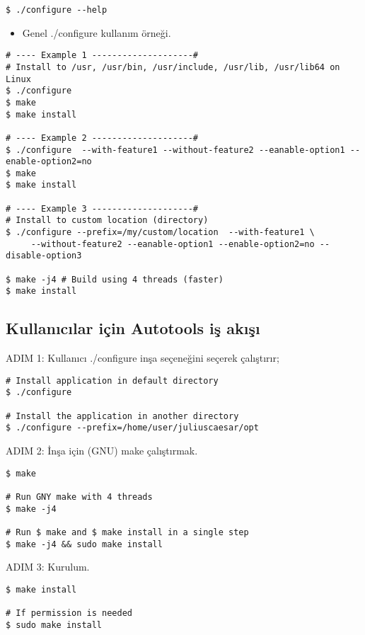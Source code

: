 \documentclass[
]{book}
\providecommand{\tightlist}{%
  \setlength{\itemsep}{0pt}\setlength{\parskip}{0pt}}
\begin{document}
\texttt{\$\ ./configure\ -\/-help}

\begin{itemize}
\tightlist
\item
  Genel ./configure kullanım örneği.
\end{itemize}

\begin{verbatim}
# ---- Example 1 --------------------#
# Install to /usr, /usr/bin, /usr/include, /usr/lib, /usr/lib64 on Linux 
$ ./configure  
$ make 
$ make install 

# ---- Example 2 --------------------#
$ ./configure  --with-feature1 --without-feature2 --eanable-option1 --enable-option2=no 
$ make 
$ make install 

# ---- Example 3 --------------------#
# Install to custom location (directory)
$ ./configure --prefix=/my/custom/location  --with-feature1 \
     --without-feature2 --eanable-option1 --enable-option2=no --disable-option3

$ make -j4 # Build using 4 threads (faster)
$ make install 
\end{verbatim}

\hypertarget{kullanux131cux131lar-iuxe7in-autotools-iux15f-akux131ux15fux131}{%
\subsection{Kullanıcılar için Autotools iş akışı}\label{kullanux131cux131lar-iuxe7in-autotools-iux15f-akux131ux15fux131}}

ADIM 1: Kullanıcı ./configure inşa seçeneğini seçerek çalıştırır;

\begin{verbatim}
# Install application in default directory
$ ./configure

# Install the application in another directory 
$ ./configure --prefix=/home/user/juliuscaesar/opt
\end{verbatim}

ADIM 2: İnşa için (GNU) make çalıştırmak.

\begin{verbatim}
$ make 

# Run GNY make with 4 threads 
$ make -j4 

# Run $ make and $ make install in a single step 
$ make -j4 && sudo make install 
\end{verbatim}

ADIM 3: Kurulum.

\begin{verbatim}
$ make install 

# If permission is needed 
$ sudo make install 
\end{verbatim}
\end{document}
